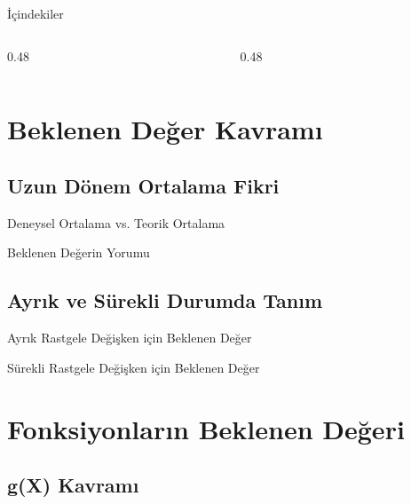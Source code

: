 \documentclass[light]{lutbeamer}
\begin{document}
\begin{frame}{İçindekiler}
  \scriptsize
  \begin{columns}[T]
    \begin{column}{0.48\textwidth}
      \tableofcontents[sections={1-4}]
    \end{column}
    \begin{column}{0.48\textwidth}
      \tableofcontents[sections={5-10}]
    \end{column}
  \end{columns}
\end{frame}


\section{Beklenen Değer Kavramı}
\subsection{Uzun Dönem Ortalama Fikri}

\begin{frame}{Deneysel Ortalama vs. Teorik Ortalama}
\end{frame}

\begin{frame}{Beklenen Değerin Yorumu}
\end{frame}

\subsection{Ayrık ve Sürekli Durumda Tanım}

\begin{frame}{Ayrık Rastgele Değişken için Beklenen Değer}
\end{frame}

\begin{frame}{Sürekli Rastgele Değişken için Beklenen Değer}
\end{frame}

\section{Fonksiyonların Beklenen Değeri}
\subsection{g(X) Kavramı}
\end{document}
